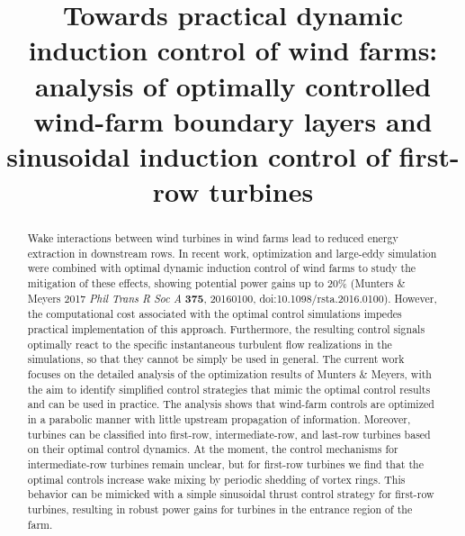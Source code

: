 \documentclass[wes, manuscript]{copernicus}
\begin{document}
\title{Towards practical dynamic induction control of wind farms: analysis of optimally controlled wind-farm boundary layers and sinusoidal induction control of first-row turbines}




\received{}
\pubdiscuss{} %
\revised{}
\accepted{}
\published{}

\maketitle

\begin{abstract}
	Wake interactions between wind turbines in wind farms lead to reduced energy extraction in downstream rows. In recent work, optimization and large-eddy simulation were combined with optimal dynamic induction control of wind farms to study the mitigation of these effects, showing potential power gains up to 20\% (Munters \& Meyers 2017 \emph{Phil Trans R Soc A} \textbf{375}, 20160100, doi:10.1098/rsta.2016.0100). However, the computational cost associated with the optimal control simulations impedes practical implementation of this approach. Furthermore, the resulting control signals optimally react to the specific instantaneous turbulent flow realizations in the simulations, so that they cannot be simply be used in general. The current work focuses on the detailed analysis of the optimization results of Munters \& Meyers, with the aim to identify simplified control strategies that mimic the optimal control results and can be used in practice. The analysis shows that wind-farm controls are optimized in a parabolic manner with little upstream propagation of information. Moreover, turbines can be classified into first-row, intermediate-row, and last-row turbines based on their optimal control dynamics. At the moment, the control mechanisms for intermediate-row turbines remain unclear, but for first-row turbines we find that the optimal controls increase wake mixing by periodic shedding of vortex rings. This behavior can be mimicked with a simple sinusoidal thrust control strategy for first-row turbines, resulting in robust power gains for turbines in the entrance region of the farm.
\end{abstract}
\end{document}
